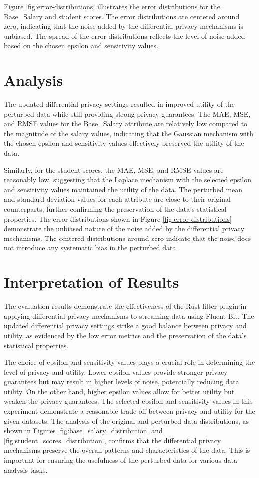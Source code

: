 Figure \ref{fig:error-distributions} illustrates the error distributions for the Base\_Salary and student scores. The error distributions are centered around zero, indicating that the noise added by the differential privacy mechanisms is unbiased. The spread of the error distributions reflects the level of noise added based on the chosen epsilon and sensitivity values.
\section{Analysis}
The updated differential privacy settings resulted in improved utility of the perturbed data while still providing strong privacy guarantees. The MAE, MSE, and RMSE values for the Base\_Salary attribute are relatively low compared to the magnitude of the salary values, indicating that the Gaussian mechanism with the chosen epsilon and sensitivity values effectively preserved the utility of the data.

Similarly, for the student scores, the MAE, MSE, and RMSE values are reasonably low, suggesting that the Laplace mechanism with the selected epsilon and sensitivity values maintained the utility of the data. The perturbed mean and standard deviation values for each attribute are close to their original counterparts, further confirming the preservation of the data's statistical properties.
The error distributions shown in Figure \ref{fig:error-distributions} demonstrate the unbiased nature of the noise added by the differential privacy mechanisms. The centered distributions around zero indicate that the noise does not introduce any systematic bias in the perturbed data.
\section{Interpretation of Results}

The evaluation results demonstrate the effectiveness of the Rust filter plugin in applying differential privacy mechanisms to streaming data using Fluent Bit. The updated differential privacy settings strike a good balance between privacy and utility, as evidenced by the low error metrics and the preservation of the data's statistical properties.

The choice of epsilon and sensitivity values plays a crucial role in determining the level of privacy and utility. Lower epsilon values provide stronger privacy guarantees but may result in higher levels of noise, potentially reducing data utility. On the other hand, higher epsilon values allow for better utility but weaken the privacy guarantees. The selected epsilon and sensitivity values in this experiment demonstrate a reasonable trade-off between privacy and utility for the given datasets.
The analysis of the original and perturbed data distributions, as shown in Figures \ref{fig:base_salary_distribution} and \ref{fig:student_scores_distribution}, confirms that the differential privacy mechanisms preserve the overall patterns and characteristics of the data. This is important for ensuring the usefulness of the perturbed data for various data analysis tasks.

